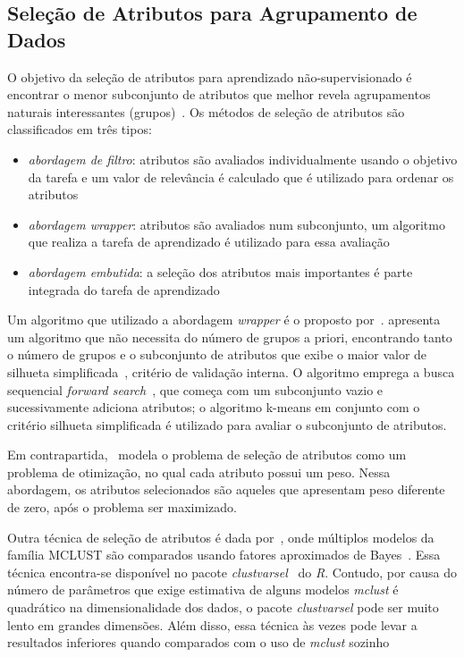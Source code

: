\documentclass{acm_proc_article-sp}
\begin{document}
\subsection{Seleção de Atributos para Agrupamento de Dados}

O objetivo da seleção de atributos para aprendizado não-supervisionado é encontrar o menor subconjunto de atributos que melhor revela agrupamentos naturais interessantes (grupos)~\cite{dy2004feature}.
Os métodos de seleção de atributos são classificados em três tipos:
\begin{itemize}
    \item \textit{abordagem de filtro}: atributos são avaliados individualmente usando o objetivo da tarefa e um valor de relevância é calculado que é utilizado para ordenar os atributos
    \item \textit{abordagem wrapper}: atributos são avaliados num subconjunto, um algoritmo que realiza a tarefa de aprendizado é utilizado para essa avaliação
    \item \textit{abordagem embutida}: a seleção dos atributos mais importantes é parte integrada do tarefa de aprendizado
\end{itemize}

Um algoritmo que utilizado a abordagem \textit{wrapper} é o proposto por~\cite{hruschka2005feature}.
\cite{hruschka2005feature} apresenta um algoritmo que não necessita do número de grupos a priori, encontrando tanto o número de grupos e o subconjunto de atributos que exibe o maior valor de silhueta simplificada~\cite{hruschka2005feature}, critério de validação interna.
O algoritmo emprega a busca sequencial \textit{forward search}~\cite{liu2005toward}, que começa com um subconjunto vazio e sucessivamente adiciona atributos; o algoritmo k-means em conjunto com o critério silhueta simplificada é utilizado para avaliar o subconjunto de atributos. 

Em contrapartida,~\cite{witten2010framework} modela o problema de seleção de atributos como um problema de otimização, no qual cada atributo possui um peso.
Nessa abordagem, os atributos selecionados são aqueles que apresentam peso diferente de zero, após o problema ser maximizado. 

Outra técnica de seleção de atributos é dada por~\cite{raftery2006variable}, onde múltiplos modelos da família MCLUST são comparados usando fatores aproximados de Bayes~\cite{kass1995bayes}.
Essa técnica encontra-se disponível no pacote \textit{clustvarsel}~\cite{dean2006clustvarsel} do \textit{R}.
Contudo, por causa do número de parâmetros que exige estimativa de alguns modelos \textit{mclust} é quadrático na dimensionalidade dos dados, o pacote \textit{clustvarsel} pode ser muito lento em grandes dimensões.
Além disso, essa técnica às vezes pode levar a resultados inferiores quando comparados com o uso de \textit{mclust} sozinho~\cite{mcnicholas2008parsimonious}
\end{document}
